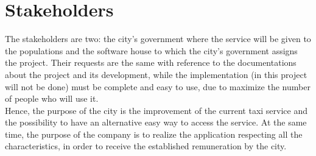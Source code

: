 \section{Stakeholders}
The stakeholders are two: the city's government where the service will be given to the populations and the software house to which the city's government assigns the project. Their requests are the same with reference to the documentations about the project and its development, while the implementation (in this project will not be done) must be complete and easy to use, due to maximize the number of people who will use it.\\
Hence, the purpose of the city is the improvement of the current taxi service and the possibility to have an alternative easy way to access the service. At the same time, the purpose of the company is to realize the application respecting all the characteristics, in order to receive the established remuneration by the city.

